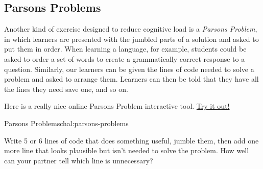 \subsection{Parsons Problems}\label{parsons-problems}

Another kind of exercise designed to reduce cognitive load is a
\emph{Parsons Problem}, in which learners are presented with the jumbled
parts of a solution and asked to put them in order. When learning a
language, for example, students could be asked to order a set of words
to create a grammatically correct response to a question. Similarly, our
learners can be given the lines of code needed to solve a problem and
asked to arrange them. Learners can then be told that they have all the
lines they need save one, and so on.

Here is a really nice online Parsons Problem interactive tool.
\href{http://runestoneinteractive.org/LearningAtScale/parsons.html}{Try
it out!}

\begin{challenge}{Parsons Problems}{chal:parsons-problems}

Write 5 or 6 lines of code that does something useful, jumble them, then
add one more line that looks plausible but isn't needed to solve the
problem. How well can your partner tell which line is unnecessary?
\end{challenge}
